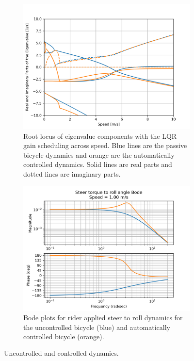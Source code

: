 \documentclass{icsc}
\begin{document}
\begin{figure}
  \centering
  \begin{subfigure}{0.49\textwidth}
    \centering
    \includegraphics[width=\textwidth]{lqr-eig.png}
    \caption{Root locus of eigenvalue components with the LQR gain scheduling
      across speed.
      Blue lines are the passive bicycle dynamics and orange are the
      automatically controlled dynamics. Solid lines are real parts and dotted
      lines are imaginary parts.}
    \label{fig:lqr-eig}
  \end{subfigure}
  \hfill
  \begin{subfigure}{0.49\textwidth}
    \centering
    \includegraphics[width=\textwidth]{lqr-steer-roll-bode-compare-v01.png}
    \caption{Bode plots for rider applied steer to roll dynamics for the
      uncontrolled bicycle (blue) and automatically controlled bicycle
      (orange).}
    \label{fig:bode}
  \end{subfigure}
  \caption{Uncontrolled and controlled dynamics.}
\end{figure}
\end{document}
